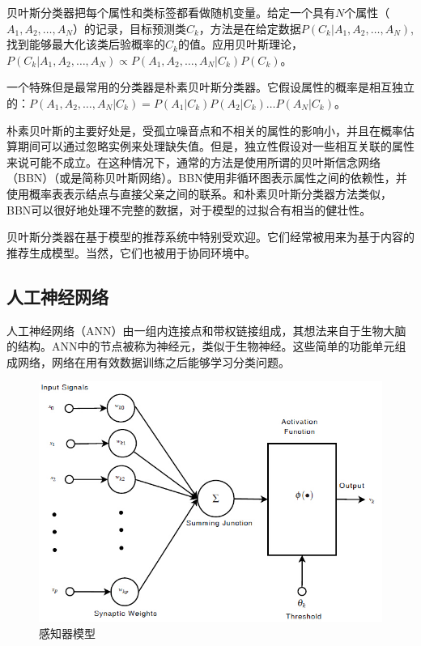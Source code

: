 \documentclass{article}
\begin{document}
贝叶斯分类器把每个属性和类标签都看做随机变量。给定一个具有$N$个属性（$A_1,A_2,\dots,A_N$）的记录，目标预测类$C_k$，方法是在给定数据$P(C_k|A_1,A_2,\dots,A_N)$,找到能够最大化该类后验概率的$C_k$的值。应用贝叶斯理论，$P(C_k|A_1,A_2,\dots,A_N)\propto P(A_1,A_2,\dots,A_N|C_k)P(C_k)$。

一个特殊但是最常用的分类器是朴素贝叶斯分类器。它假设属性的概率是相互独立的：$P(A_1,A_2,\dots,A_N|C_k)=P(A_1|C_k)P(A_2|C_k)\dots P(A_N|C_k)$。

朴素贝叶斯的主要好处是，受孤立噪音点和不相关的属性的影响小，并且在概率估算期间可以通过忽略实例来处理缺失值。但是，独立性假设对一些相互关联的属性来说可能不成立。在这种情况下，通常的方法是使用所谓的贝叶斯信念网络（BBN）（或是简称贝叶斯网络）。BBN使用非循环图表示属性之间的依赖性，并使用概率表表示结点与直接父亲之间的联系。和朴素贝叶斯分类器方法类似，BBN可以很好地处理不完整的数据，对于模型的过拟合有相当的健壮性。

贝叶斯分类器在基于模型的推荐系统中特别受欢迎。它们经常被用来为基于内容的推荐生成模型。当然，它们也被用于协同环境中。

\subsection{人工神经网络}
人工神经网络（ANN）由一组内连接点和带权链接组成，其想法来自于生物大脑的结构。ANN中的节点被称为神经元，类似于生物神经。这些简单的功能单元组成网络，网络在用有效数据训练之后能够学习分类问题。
\begin{figure}[!htb]
	  \begin{center}
	  	\includegraphics[scale=0.5]{f2.5.jpg}
	  	\caption{感知器模型}
	  \end{center}
\end{figure}
\end{document}
